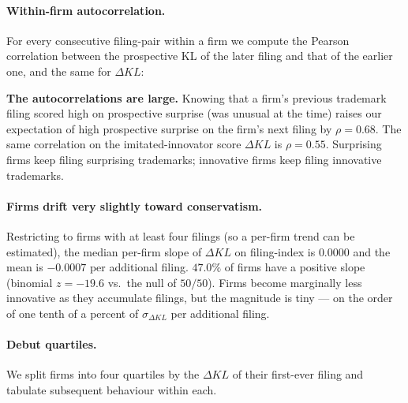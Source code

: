 \documentclass[11pt]{article}
\begin{document}
\paragraph{Within-firm autocorrelation.} For every consecutive
filing-pair within a firm we compute the Pearson correlation between
the prospective KL of the later filing and that of the earlier one,
and the same for $\Delta KL$:

\begin{table}[h]
\centering
\caption{Within-firm temporal dynamics, all 45 NICE classes,
1995--2020.}
\label{tab:dynamics}

\end{table}

\textbf{The autocorrelations are large.} Knowing that a firm's
previous trademark filing scored high on prospective surprise (was
unusual at the time) raises our expectation of high prospective
surprise on the firm's next filing by $\rho = 0.68$. The same
correlation on the imitated-innovator score $\Delta KL$ is
$\rho = 0.55$. Surprising firms keep filing surprising trademarks;
innovative firms keep filing innovative trademarks.

\paragraph{Firms drift very slightly toward conservatism.} Restricting
to firms with at least four filings (so a per-firm trend can be
estimated), the median per-firm slope of $\Delta KL$ on filing-index
is $0.0000$ and the mean is $-0.0007$ per additional filing. $47.0\%$
of firms have a positive slope (binomial $z = -19.6$ vs.\ the null of
$50/50$). Firms become marginally less innovative as they accumulate
filings, but the magnitude is tiny --- on the order of one tenth of
a percent of $\sigma_{\Delta KL}$ per additional filing.

\paragraph{Debut quartiles.} We split firms into four quartiles by
the $\Delta KL$ of their first-ever filing and tabulate subsequent
behaviour within each.

\begin{table}[h]
\centering
\caption{Debut-quartile dynamics. ``Debut $\Delta KL$'' is the
average debut score in the quartile; ``Subseq.\ mean $\Delta KL$'' is
the average across each firm's filings AFTER the debut. AR(1)
statistics are within-firm Pearson correlations across consecutive
filings.}
\label{tab:quartiles}

\end{table}
\end{document}
